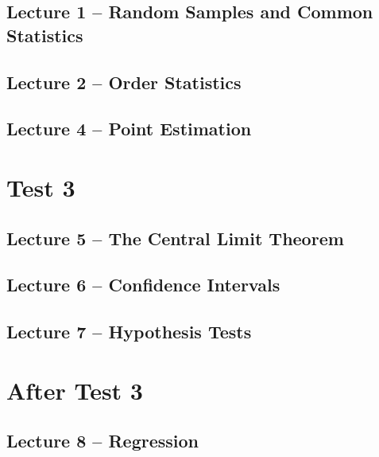\documentclass{article}
\begin{document}
\secttoc

\subsection{Lecture 1 -- Random Samples and Common Statistics}
\newpage

\subsection{Lecture 2 -- Order Statistics}
\newpage

\subsection{Lecture 4 -- Point Estimation}
\newpage


\section{Test 3}

\secttoc

\subsection{Lecture 5 -- The Central Limit Theorem}
\newpage

\subsection{Lecture 6 -- Confidence Intervals}
\newpage

\subsection{Lecture 7 -- Hypothesis Tests}
\newpage


\section{After Test 3}

\secttoc

\subsection{Lecture 8 -- Regression}
\newpage
\end{document}
